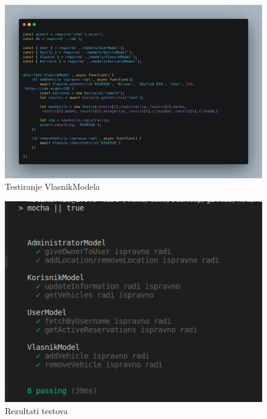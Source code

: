 			
			\begin{figure}[hp]
                    \centering
                    \includegraphics[width=15cm]{slike/VlasnikModel.png}
                    \caption{Testiranje VlasnikModela}
                    \label{fig:useCase-2}
                \end{figure}
			\eject 
			
			\begin{figure}[hp]
                    \centering
                    \includegraphics[width=15cm]{slike/rjesenjeeeee.png}
                    \caption{Rezultati testova}
                    \label{fig:useCase-2}
                \end{figure}
			\eject 
			
			
			

